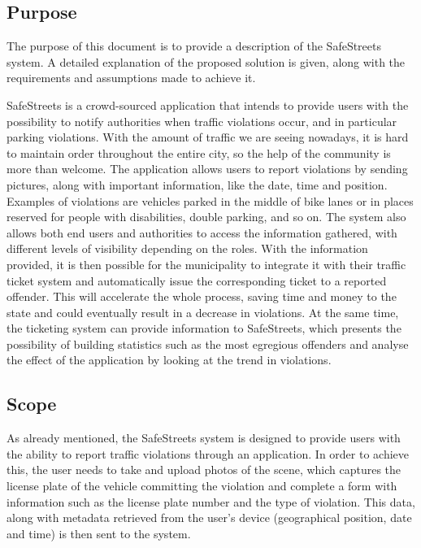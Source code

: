 \subsection{Purpose}

The purpose of this document is to provide a description of the SafeStreets system. A detailed explanation of the proposed solution is given, along with the requirements and assumptions made to achieve it.

SafeStreets is a crowd-sourced application that	 intends to provide users with the possibility to notify authorities when traffic violations occur, and in particular	 parking violations. With the amount of traffic we are seeing nowadays, it is hard to maintain order throughout the entire city, so the help of the community is more than welcome.
The application allows users to report violations by sending pictures, along with important information, like the date, time and position.
Examples of violations are vehicles parked in the middle of bike lanes or in places reserved for people with disabilities, double parking, and so on.
The system also allows both end users and authorities to access the information gathered, with different levels of visibility depending on the roles.
With the information provided, it is then possible for the municipality to integrate it with their traffic ticket system and automatically issue the corresponding ticket to a reported offender. This will accelerate the whole process, saving time and money to the state and could eventually result in a decrease in violations.
At the same time, the ticketing system can provide information to SafeStreets, which presents the possibility of building statistics such as the most egregious offenders and analyse the effect of the application by looking at the trend in violations.

\subsection{Scope}

As already mentioned, the SafeStreets system is designed to provide users with the ability to report traffic violations through an application. In order to achieve this, the user needs to take and upload photos of the scene, which captures the license plate of the vehicle committing the violation and complete a form with information such as the license plate number and the type of violation. This data, along with metadata retrieved from the user’s device (geographical position, date and time) is then sent to the system.

